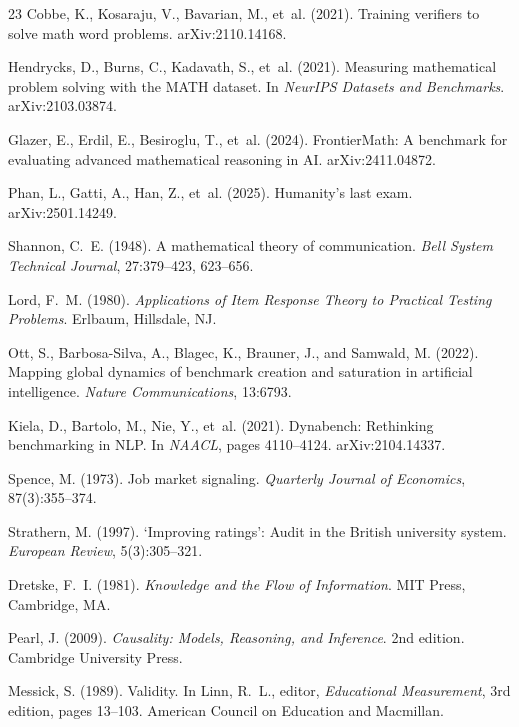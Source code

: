 \documentclass[11pt]{article}
\theoremstyle{plain}
\begin{document}
\begin{thebibliography}{23}
Cobbe, K., Kosaraju, V., Bavarian, M., et~al. (2021). Training verifiers
to solve math word problems. arXiv:2110.14168.

Hendrycks, D., Burns, C., Kadavath, S., et~al. (2021). Measuring
mathematical problem solving with the {MATH} dataset. In \emph{NeurIPS
Datasets and Benchmarks}. arXiv:2103.03874.

Glazer, E., Erdil, E., Besiroglu, T., et~al. (2024). {FrontierMath}: A
benchmark for evaluating advanced mathematical reasoning in {AI}.
arXiv:2411.04872.

Phan, L., Gatti, A., Han, Z., et~al. (2025). Humanity's last exam.
arXiv:2501.14249.

Shannon, C.~E. (1948). A mathematical theory of communication.
\emph{Bell System Technical Journal}, 27:379--423, 623--656.

Lord, F.~M. (1980). \emph{Applications of Item Response Theory to
Practical Testing Problems}. Erlbaum, Hillsdale, NJ.

Ott, S., Barbosa-Silva, A., Blagec, K., Brauner, J., and Samwald, M.
(2022). Mapping global dynamics of benchmark creation and saturation in
artificial intelligence. \emph{Nature Communications}, 13:6793.

Kiela, D., Bartolo, M., Nie, Y., et~al. (2021). Dynabench: Rethinking
benchmarking in {NLP}. In \emph{NAACL}, pages 4110--4124.
arXiv:2104.14337.

Spence, M. (1973). Job market signaling. \emph{Quarterly Journal of
Economics}, 87(3):355--374.

Strathern, M. (1997). `{Improving} ratings': Audit in the {British}
university system. \emph{European Review}, 5(3):305--321.

Dretske, F.~I. (1981). \emph{Knowledge and the Flow of Information}.
MIT Press, Cambridge, MA.

Pearl, J. (2009). \emph{Causality: Models, Reasoning, and Inference}.
2nd edition. Cambridge University Press.

Messick, S. (1989). Validity. In Linn, R.~L., editor, \emph{Educational
Measurement}, 3rd edition, pages 13--103. American Council on
Education and Macmillan.

\end{thebibliography}
\end{document}
